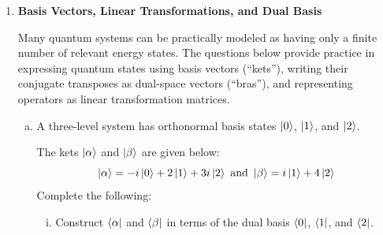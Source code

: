 \documentclass[10pt,letterpaper]{article}
\begin{document}
\begin{enumerate}
\begin{enumerate}[a)]
\item Show that $\hat{H} = -\frac{\hbar^{2}}{2m}\frac{d^{2}}{dx} + V(x)$, the Hamiltonian operator, is Hermitian.

\color{violet}
The Hamiltonian could be rewritten as $\frac{\hat{p}^{2}}{2m} + V(x)$. $V(x)^{\dagger} = V(x)$, and the momentum operator is Hermitian. Given some definition of the operator $\frac{d}{dx}$ is not Hermitian, adding some $-i\hbar$ would result in
$$\braket{f | -i\hbar\frac{d}{dx}g} = \int f^{*}(-i\hbar)g'dx = (-i\hbar)\int f^{*}g'dx = (-i\hbar)(f^{*}g - \int f^{*'}gdx) = -\left\langle i\hbar \frac{d}{dx} f | g \right\rangle = \left\langle -i\hbar \frac{d}{dx} f | g \right\rangle$$
\color{black}

\item Construct the Hermitian adjoint of $\hat{a} = \sqrt{\frac{m\omega}{2\hbar}}(\hat{x} + \frac{i}{m\omega}\hat{p})$, the annihilation operator. What is its relationship to the creation operator $\hat{a}^{\dagger}$. 

\color{violet}
Given that the position and momentum operator are both Hermitian, so the only element that is conjugate is $i$, so the creation operator has the following form
$$\hat{a}^{\dagger} = \sqrt{\frac{m\omega}{2\hbar}}(\hat{x} - \frac{i}{m\omega}\hat{p})$$
\color{black}

\end{enumerate}

\item \textbf{Basis Vectors, Linear Transformations, and Dual Basis}

Many quantum systems can be practically modeled as having only a finite number of relevant energy states. The questions below provide practice in expressing quantum states using basis vectors (“kets”), writing their conjugate transposes as dual-space vectors (“bras”), and representing operators as linear transformation matrices.

\begin{enumerate}[a)]

\item A three-level system has orthonormal basis states $\ket{0}$, $\ket{1}$, and $\ket{2}$.

The kets $\ket{\alpha}$ and $\ket{\beta}$ are given below:
$$\ket{\alpha} = -i\ket{0} + 2\ket{1} + 3i\ket{2} \text{  and  } \ket{\beta} = i\ket{1} + 4\ket{2}$$
Complete the following:

\begin{enumerate}[i)]

\item Construct $\bra{\alpha}$ and $\bra{\beta}$ in terms of the dual basis $\bra{0}$, $\bra{1}$, and $\bra{2}$.


\end{enumerate}
\end{enumerate}
\end{enumerate}
\end{document}
